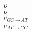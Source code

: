 \documentclass{article}
\begin{document}
\begin{align}
	\widehat{\nu} \\
	\nu \\
	\nu_{GC \rightarrow AT} \\
	\nu_{AT \rightarrow GC}
\end{align}
\end{document}
